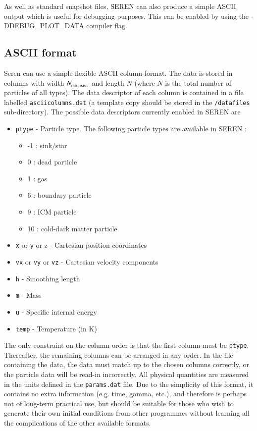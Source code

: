 \documentclass[a4paper]{article}
\newcommand{\var}[1]{\texttt{#1}}
\begin{document}
As well as standard snapshot files, SEREN can also produce a simple ASCII output which is useful for debugging purposes.  This can be enabled by using the {\rm -DDEBUG\_PLOT\_DATA} compiler flag.


\subsection{ASCII format}
Seren can use a simple flexible ASCII column-format.  The data is stored in columns with width $N_{_{\rm COLUMNS}}$ and length $N$ (where $N$ is the total number of particles of all types).  The data descriptor of each column is contained in a file labelled \var{asciicolumns.dat} (a template copy should be stored in the \var{/datafiles} sub-directory).  The possible data descriptors currently enabled in SEREN are
\begin{itemize} 
\item \var{ptype} - Particle type.  The following particle types are available in SEREN : 
\begin{itemize}
\item -1 : sink/star
\item  0 : dead particle
\item  1 : gas
\item  6 : boundary particle
\item  9 : ICM particle
\item 10 : cold-dark matter particle
\end{itemize}
\item \var{x} or \var{y} or {z} - Cartesian position coordinates
\item \var{vx} or \var{vy} or \var{vz} - Cartesian velocity components
\item \var{h} - Smoothing length
\item \var{m} - Mass
\item \var{u} - Specific internal energy
\item \var{temp} - Temperature (in K)
\end{itemize}
The only constraint on the column order is that the first column must be \var{ptype}.  Thereafter, the remaining columns can be arranged in any order.  In the file containing the data, the data must match up to the chosen columns correctly, or the particle data will be read-in incorrectly.  All physical quantities are measured in the units defined in the \var{params.dat} file.  Due to the simplicity of this format, it contains no extra information (e.g. time, gamma, etc.), and therefore is perhaps not of long-term practical use, but should be suitable for those who wish to generate their own initial conditions from other programmes without learning all the complications of the other available formats.
\end{document}
